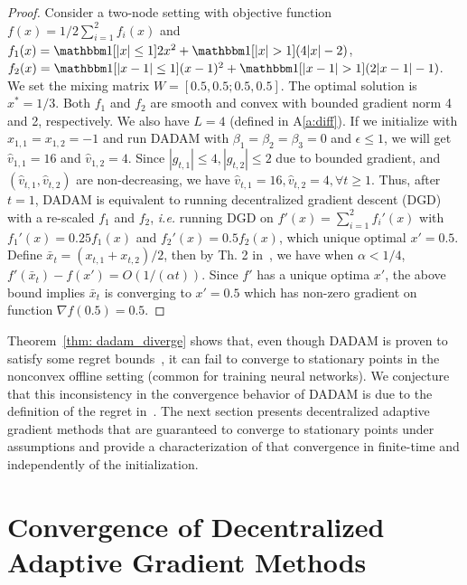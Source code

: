 \documentclass{article} %
\begin{document}
\vspace{-0.15in}

\begin{proof}
Consider a two-node setting with objective function $f(x) =1/2 \sum_{i=1}^2 f_i(x)$ and $f_1(x) =  \mathbbm 1[|x|\leq 1] 2x^2 +  \mathbbm 1[|x|> 1] (4|x|-2)$, $f_2(x) =  \mathbbm 1[|x-1|\leq 1](x-1)^2 + \mathbbm 1[|x-1| > 1] (2|x-1|-1)$. We set the mixing matrix  $W = [0.5,0.5;0.5,0.5]$. The optimal solution is $x^* = 1/3$.
Both $f_1$ and $f_2$ are smooth and convex with bounded gradient norm 4 and 2, respectively. 
We also have $L = 4$ (defined in A\ref{a:diff}). 
If we initialize with $x_{1,1} = x_{1,2} = -1$ and run DADAM with $\beta_1 = \beta_2 =\beta_3 = 0$ and $\epsilon \leq 1$, we will get $\hat v_{1,1} = 16$ and $\hat v_{1,2} = 4$. 
Since $|g_{t,1}| \leq 4, |g_{t,2}| \leq 2$ due to bounded gradient, and $(\hat v_{t,1},\hat v_{t,2})$ are non-decreasing, we have $\hat v_{t,1} = 16, \hat v_{t,2}=4, \forall t \geq 1$. 
Thus, after $t=1$, DADAM is equivalent to running decentralized gradient descent (DGD)~\citep{yuan2016convergence} with a re-scaled $f_1$ and $f_2$, \textit{i.e.} running DGD on
$f'(x) = \sum_{i=1}^2 f_i'(x)$ with $f_1'(x) =  0.25 f_1(x)$ and $f_2'(x) = 0.5  f_2(x)$, which unique optimal $x'=0.5$. 
Define $\bar x_t = (x_{t,1}+x_{t,2})/2$, then by Th. 2 in~\citet{yuan2016convergence}, we have when $\alpha < 1/4$, $f'(\bar x_t) - f(x') = O(1/(\alpha t))$. 
Since $f'$ has a unique optima $x'$, the above bound implies $\bar x_t$ is converging to $x'=0.5$ which has non-zero gradient on function $\nabla f(0.5) = 0.5$.
\end{proof}

Theorem~\ref{thm: dadam_diverge} shows that, even though DADAM is proven to satisfy some regret bounds~\citep{nazari2019dadam}, it can fail to converge to stationary points in the nonconvex offline setting (common for training neural networks). 
We conjecture that this inconsistency in the convergence behavior of DADAM is due to the definition of the regret in~\citet{nazari2019dadam}. 
The next section presents decentralized adaptive gradient methods that are guaranteed to converge to stationary points under  assumptions and provide a characterization of that convergence in finite-time and independently of the initialization.

\vspace{-0.05in}
\section{Convergence of Decentralized Adaptive Gradient Methods}\label{sec:main}
\vspace{-0.05in}
\end{document}
